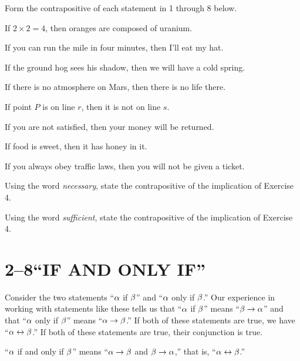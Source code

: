 \documentclass[11pt]{book}
\begin{document}

Form the contrapositive of each statement in 1 through 8 below.

\begin{exercisecols}
\begin{exlist}
\item If $2 \times 2 = 4$, then oranges are composed of uranium.
\item If you can run the mile in four minutes, then I'll eat my hat.
\item If the ground hog sees his shadow, then we will have a cold spring.
\item If there is no atmosphere on Mars, then there is no life there.
\item If point $P$ is on line $r$, then it is not on line $s$.
\item If you are not satisfied, then your money will be returned.
\item If food is sweet, then it has honey in it.
\item If you always obey traffic laws, then you will not be given a ticket.
\item[\stex 9.] Using the word \emph{necessary}, state the contrapositive of the
      implication of Exercise 4.
\item[\stex 10.] Using the word \emph{sufficient}, state the contrapositive of the
      implication of Exercise 4.
\end{exlist}
\end{exercisecols}

\section*{2--8\quad ``IF AND ONLY IF''}

Consider the two statements ``$\alpha$ if $\beta$'' and ``$\alpha$ only if $\beta$.'' Our
experience in working with statements like these tells us that ``$\alpha$ if $\beta$''
means ``$\beta \rightarrow \alpha$'' and that ``$\alpha$ only if $\beta$'' means ``$\alpha \rightarrow \beta$.''
If both of these statements are true, we have ``$\alpha \leftrightarrow \beta$.'' If both of
these statements are true, their conjunction is true.

\begin{definition}
``$\alpha$ if and only if $\beta$'' means ``$\alpha \rightarrow \beta$ and $\beta \rightarrow \alpha$,'' that
is, ``$\alpha \leftrightarrow \beta$.''
\end{definition}
\end{document}
